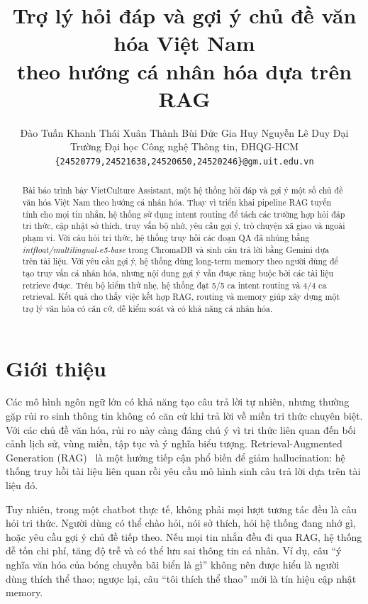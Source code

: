 \documentclass[11pt]{article}
\title{Trợ lý hỏi đáp và gợi ý chủ đề văn hóa Việt Nam\\theo hướng cá nhân hóa dựa trên RAG}
\author{
  Đào Tuấn Khanh \quad
  Thái Xuân Thành \quad
  Bùi Đức Gia Huy \quad
  Nguyễn Lê Duy Đại \\
  Trường Đại học Công nghệ Thông tin, ĐHQG-HCM \\
  \texttt{\{24520779,24521638,24520650,24520246\}@gm.uit.edu.vn}
}
\begin{document}
\maketitle

\begin{abstract}
Bài báo trình bày VietCulture Assistant, một hệ thống hỏi đáp và gợi ý một số chủ đề văn hóa Việt Nam theo hướng cá nhân hóa. Thay vì triển khai pipeline RAG tuyến tính cho mọi tin nhắn, hệ thống sử dụng intent routing để tách các trường hợp hỏi đáp tri thức, cập nhật sở thích, truy vấn bộ nhớ, yêu cầu gợi ý, trò chuyện xã giao và ngoài phạm vi. Với câu hỏi tri thức, hệ thống truy hồi các đoạn QA đã nhúng bằng \textit{intfloat/multilingual-e5-base} trong ChromaDB và sinh câu trả lời bằng Gemini dựa trên tài liệu. Với yêu cầu gợi ý, hệ thống dùng long-term memory theo người dùng để tạo truy vấn cá nhân hóa, nhưng nội dung gợi ý vẫn được ràng buộc bởi các tài liệu retrieve được. Trên bộ kiểm thử nhẹ, hệ thống đạt 5/5 ca intent routing và 4/4 ca retrieval. Kết quả cho thấy việc kết hợp RAG, routing và memory giúp xây dựng một trợ lý văn hóa có căn cứ, dễ kiểm soát và có khả năng cá nhân hóa.
\end{abstract}

\section{Giới thiệu}

Các mô hình ngôn ngữ lớn có khả năng tạo câu trả lời tự nhiên, nhưng thường gặp rủi ro sinh thông tin không có căn cứ khi trả lời về miền tri thức chuyên biệt. Với các chủ đề văn hóa, rủi ro này càng đáng chú ý vì tri thức liên quan đến bối cảnh lịch sử, vùng miền, tập tục và ý nghĩa biểu tượng. Retrieval-Augmented Generation (RAG)~\citep{lewis2020retrieval} là một hướng tiếp cận phổ biến để giảm hallucination: hệ thống truy hồi tài liệu liên quan rồi yêu cầu mô hình sinh câu trả lời dựa trên tài liệu đó.

Tuy nhiên, trong một chatbot thực tế, không phải mọi lượt tương tác đều là câu hỏi tri thức. Người dùng có thể chào hỏi, nói sở thích, hỏi hệ thống đang nhớ gì, hoặc yêu cầu gợi ý chủ đề tiếp theo. Nếu mọi tin nhắn đều đi qua RAG, hệ thống dễ tốn chi phí, tăng độ trễ và có thể lưu sai thông tin cá nhân. Ví dụ, câu ``ý nghĩa văn hóa của bóng chuyền bãi biển là gì'' không nên được hiểu là người dùng thích thể thao; ngược lại, câu ``tôi thích thể thao'' mới là tín hiệu cập nhật memory.
\end{document}
